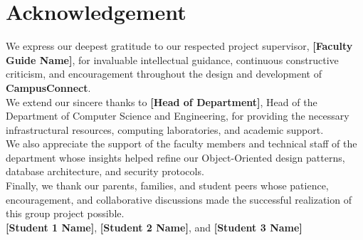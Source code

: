 \documentclass[12pt,a4paper,oneside]{report}
\begin{document}
\chapter*{Acknowledgement}
We express our deepest gratitude to our respected project supervisor, \textbf{[Faculty Guide Name]}, for invaluable intellectual guidance, continuous constructive criticism, and encouragement throughout the design and development of \textbf{CampusConnect}.\\[0.4cm]
We extend our sincere thanks to \textbf{[Head of Department]}, Head of the Department of Computer Science and Engineering, for providing the necessary infrastructural resources, computing laboratories, and academic support.\\[0.4cm]
We also appreciate the support of the faculty members and technical staff of the department whose insights helped refine our Object-Oriented design patterns, database architecture, and security protocols.\\[0.4cm]
Finally, we thank our parents, families, and student peers whose patience, encouragement, and collaborative discussions made the successful realization of this group project possible.\\[1.0cm]
\textbf{[Student 1 Name]}, \textbf{[Student 2 Name]}, and \textbf{[Student 3 Name]}

\newpage
\end{document}
